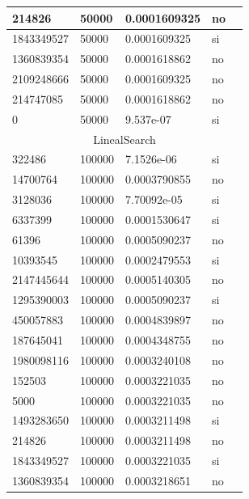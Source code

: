 \documentclass[12pt, fleqn]{article}                             %
\theoremstyle{break}                                            %
\begin{document}
\begin{longtable}{|m{5em}|m{5em}|m{10em}|m{5em}|@{}m{0pt}@{}}
            214826& 50000  & 0.0001609325 & no &\\[1em]    \hline
            1843349527& 50000  & 0.0001609325 & si &\\[1em]    \hline
            1360839354& 50000  & 0.0001618862 & no &\\[1em]    \hline
            2109248666& 50000  & 0.0001609325 & no &\\[1em]    \hline
            214747085& 50000  & 0.0001618862 & no &\\[1em]    \hline
            0& 50000  & 9.537e-07 & si &\\[1em]    \hline
            \multicolumn{5}{|c|}{LinealSearch}   \\          \hline
            322486& 100000  & 7.1526e-06 & si &\\[1em]    \hline
            14700764& 100000  & 0.0003790855 & no &\\[1em]    \hline
            3128036& 100000  & 7.70092e-05 & si &\\[1em]    \hline
            6337399& 100000  & 0.0001530647 & si &\\[1em]    \hline
            61396& 100000  & 0.0005090237 & no &\\[1em]    \hline
            10393545& 100000  & 0.0002479553 & si &\\[1em]    \hline
            2147445644& 100000  & 0.0005140305 & no &\\[1em]    \hline
            1295390003& 100000  & 0.0005090237 & si &\\[1em]    \hline
            450057883& 100000  & 0.0004839897 & no &\\[1em]    \hline
            187645041& 100000  & 0.0004348755 & no &\\[1em]    \hline
            1980098116& 100000  & 0.0003240108 & no &\\[1em]    \hline
            152503& 100000  & 0.0003221035 & no &\\[1em]    \hline
            5000& 100000  & 0.0003221035 & no &\\[1em]    \hline
            1493283650& 100000  & 0.0003211498 & si &\\[1em]    \hline
            214826& 100000  & 0.0003211498 & no &\\[1em]    \hline
            1843349527& 100000  & 0.0003221035 & si &\\[1em]    \hline
            1360839354& 100000  & 0.0003218651 & no &\\[1em]    \hline

\end{longtable}
\end{document}
